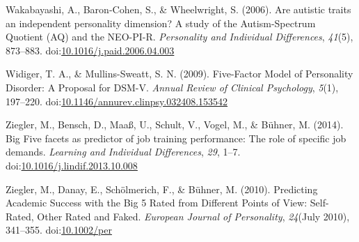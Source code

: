 \documentclass[,man,floatsintext]{apa6}
\theoremstyle{definition}
\theoremstyle{definition}
\theoremstyle{definition}
\theoremstyle{remark}
\begin{document}
\leavevmode\hypertarget{ref-Wakabayashi2006}{}%
Wakabayashi, A., Baron-Cohen, S., \& Wheelwright, S. (2006). Are
autistic traits an independent personality dimension? A study of the
Autism-Spectrum Quotient (AQ) and the NEO-PI-R. \emph{Personality and
Individual Differences}, \emph{41}(5), 873--883.
doi:\href{https://doi.org/10.1016/j.paid.2006.04.003}{10.1016/j.paid.2006.04.003}

\leavevmode\hypertarget{ref-WidigerMullins2009}{}%
Widiger, T. A., \& Mullins-Sweatt, S. N. (2009). Five-Factor Model of
Personality Disorder: A Proposal for DSM-V. \emph{Annual Review of
Clinical Psychology}, \emph{5}(1), 197--220.
doi:\href{https://doi.org/10.1146/annurev.clinpsy.032408.153542}{10.1146/annurev.clinpsy.032408.153542}

\leavevmode\hypertarget{ref-Ziegler2014}{}%
Ziegler, M., Bensch, D., Maaß, U., Schult, V., Vogel, M., \& Bühner, M.
(2014). Big Five facets as predictor of job training performance: The
role of specific job demands. \emph{Learning and Individual
Differences}, \emph{29}, 1--7.
doi:\href{https://doi.org/10.1016/j.lindif.2013.10.008}{10.1016/j.lindif.2013.10.008}

\leavevmode\hypertarget{ref-Ziegler2010}{}%
Ziegler, M., Danay, E., Schölmerich, F., \& Bühner, M. (2010).
Predicting Academic Success with the Big 5 Rated from Different Points
of View: Self-Rated, Other Rated and Faked. \emph{European Journal of
Personality}, \emph{24}(July 2010), 341--355.
doi:\href{https://doi.org/10.1002/per}{10.1002/per}

\endgroup

\clearpage

\renewcommand{\listtablename}{Table captions}

\listoftables
\end{document}

